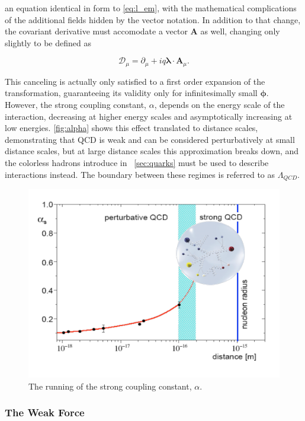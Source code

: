 an equation identical in form to \autoref{eq:l_em}, with the mathematical complications of the additional fields hidden by the vector notation. In addition to that change, the covariant derivative must accomodate a vector $\bm{A}$ as well, changing only slightly to be defined as

\begin{equation}
\mathcal{D}_\mu = \partial_\mu + iq\bm{\lambda} \cdot \bm{A}_\mu .
\end{equation}

This canceling is actually only satisfied to a first order expansion of the transformation, guaranteeing its validity only for infinitesimally small $\bm{\phi}$. However, the strong coupling constant, $\alpha$, depends on the energy scale of the interaction, decreasing at higher energy scales and asymptotically increasing at low energies. \autoref{fig:alpha} shows this effect translated to distance scales, demonstrating that QCD is weak and can be considered perturbatively at small distance scales, but at large distance scales this approximation breaks down, and the colorless hadrons introduce in ~\autoref{sec:quarks} must be used to describe interactions instead. The boundary between these regimes is referred to as $\Lambda_{QCD}$. 

\begin{centering}
\begin{figure}[bth]
\myfloatalign
\includegraphics[width=.85\linewidth]{figures/theory/strong_coupling.png}
\caption{The running of the strong coupling constant, $\alpha$. \cite{Messchendorp:2013ysj}}
\label{fig:alpha}
\end{figure}
\end{centering}

\subsubsection{The Weak Force}

